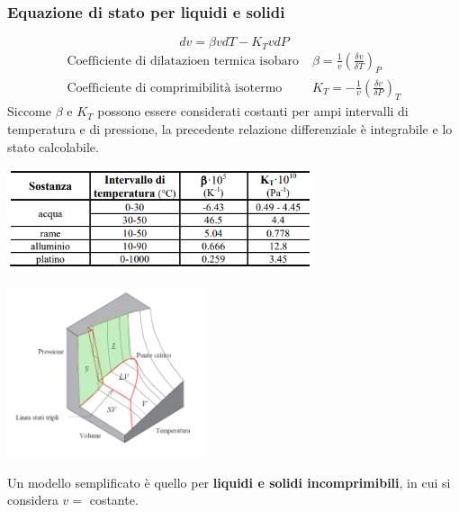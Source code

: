 \subsubsection{Equazione di stato per liquidi e solidi}
\[
    dv = \beta v dT - K_T v dP
\]
\[
    \begin{matrix}
        \text{Coefficiente di dilatazioen termica isobaro}\; & \beta = \frac{1}{v}\left(\frac{\delta v}{\delta T}\right)_P\\
        \text{Coefficiente di comprimibilità isotermo}\; & K_T = - \frac{1}{v}\left( \frac{\delta v}{ \delta P} \right)_T
    \end{matrix}
\]
Siccome $\beta$ e $K_T$ possono essere considerati costanti per ampi intervalli di temperatura e di pressione, la precedente relazione differenziale è integrabile e lo stato calcolabile.
\begin{center}
    \includegraphics[height=3cm]{../L01/img9.PNG}
\end{center}
\begin{center}
    \includegraphics[height=5cm]{../L01/img7.PNG}
\end{center}
Un modello semplificato è quello per \textbf{liquidi e solidi incomprimibili}, in cui si considera $v =$ costante.